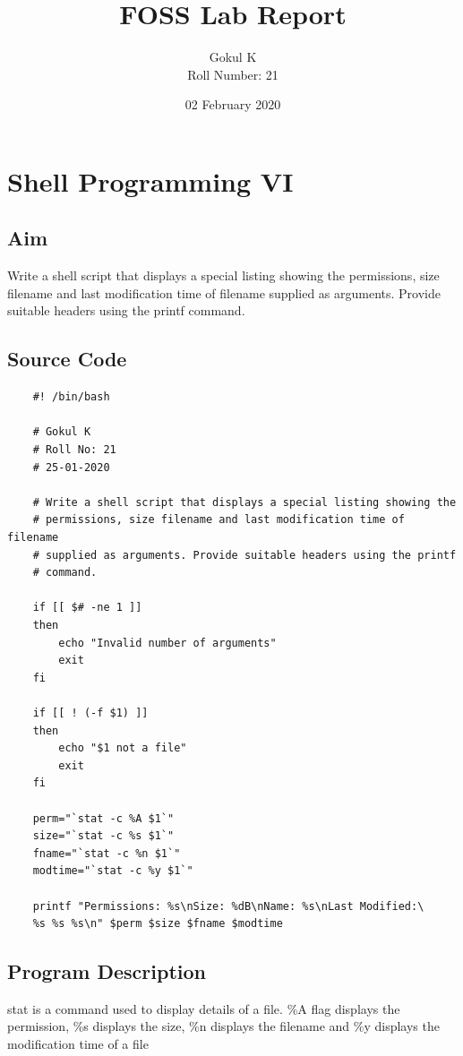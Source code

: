 \documentclass{article}
\begin{document}
\title{FOSS Lab Report}
\author{Gokul K\\[2\baselineskip]
Roll Number: 21\\[2\baselineskip]}
\date{02 February 2020}

\maketitle

\setcounter{section}{9}
\section{Shell Programming VI}
\subsection{Aim}
Write a shell script that displays a special listing showing the
permissions, size filename and last modification time of filename
supplied as arguments. Provide suitable headers using the printf
command.


\subsection{Source Code}
\begin{verbatim}
    #! /bin/bash

    # Gokul K
    # Roll No: 21
    # 25-01-2020

    # Write a shell script that displays a special listing showing the
    # permissions, size filename and last modification time of filename
    # supplied as arguments. Provide suitable headers using the printf
    # command.
    
    if [[ $# -ne 1 ]]
    then
        echo "Invalid number of arguments"
        exit
    fi
    
    if [[ ! (-f $1) ]]
    then
        echo "$1 not a file"
        exit
    fi
    
    perm="`stat -c %A $1`"
    size="`stat -c %s $1`"
    fname="`stat -c %n $1`"
    modtime="`stat -c %y $1`"
    
    printf "Permissions: %s\nSize: %dB\nName: %s\nLast Modified:\
    %s %s %s\n" $perm $size $fname $modtime
\end{verbatim}

\subsection{Program Description}
stat is a command used to display details of a file. \%A flag displays the 
permission, \%s displays the size, \%n displays the filename and \%y displays
the modification time of a file
\end{document}
